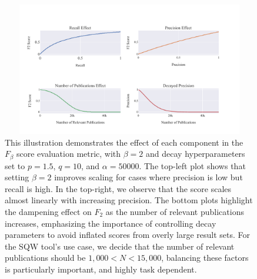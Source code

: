 \begin{figure}[!t]
	\hspace*{-1cm}
	\includegraphics[width=450px, height=220px]{pics/f_score.pdf}
	\caption[$F_{\beta}$ Components Analysis]{This illustration demonstrates the effect of each component in the $F_{\beta}$ score evaluation metric, with $\beta=2$ and decay hyperparameters set to $p=1.5$, $q=10$, and $\alpha=50000$. The top-left plot shows that setting $\beta=2$ improves scaling for cases where precision is low but recall is high. In the top-right, we observe that the score scales almost linearly with increasing precision. The bottom plots highlight the dampening effect on $F_2$ as the number of relevant publications increases, emphasizing the importance of controlling decay parameters to avoid inflated scores from overly large result sets. For the SQW tool's use case, we decide that the number of relevant publications should be $1,000 < N < 15,000$, balancing these factors is particularly important, and highly task dependent.}\label{fig:f-score}
\end{figure}


